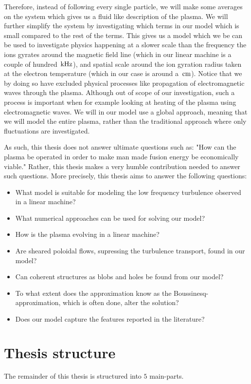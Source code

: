 Therefore, instead of following every single particle, we will make some averages on the system which gives us a fluid like description of the plasma.
We will further simplify the system by investigating which terms in our model which is small compared to the rest of the terms.
This gives us a model which we be can be used to investigate physics happening at a slower scale than the frequency the ions gyrates around the magnetic field line (which in our linear machine is a couple of hundred $\, \text{kHz}$), and spatial scale around the ion gyration radius taken at the electron temperature (which in our case is around a $\, \text{cm}$).
Notice that we by doing so have excluded physical processes like propagation of electromagnetic waves through the plasma.
Although out of scope of our investigation, such a process is important when for example looking at heating of the plasma using electromagnetic waves.
We will in our model use a global approach, meaning that we will model the entire plasma, rather than the traditional approach where only fluctuations are investigated.

As such, this thesis does not answer ultimate questions such as:
"How can the plasma be operated in order to make man made fusion energy be economically viable."
Rather, this thesis makes a very humble contribution needed to answer such questions.
More precisely, this thesis aims to answer the following questions:
%
\begin{itemize}[noitemsep]
    \item What model is suitable for modeling the low frequency turbulence observed in a linear machine?
    \item What numerical approaches can be used for solving our model?
    \item How is the plasma evolving in a linear machine?
    \item Are sheared poloidal flows, supressing the turbulence transport, found in our model?
    \item Can coherent structures as blobs and holes be found from our model?
    \item To what extent does the approximation know as the Boussinesq-approximation, which is often done, alter the solution?
    \item Does our model capture the features reported in the literature?
\end{itemize}

\section{Thesis structure}
%
The remainder of this thesis is structured into $5$ main-parts.

